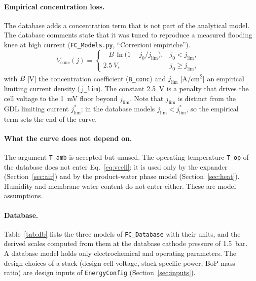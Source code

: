 \documentclass[a4paper,11pt]{article}
\newcommand{\code}[1]{\nolinkurl{#1}}
\newcommand{\fn}[1]{\nolinkurl{#1}}
\begin{document}
\paragraph{Empirical concentration loss.} The database adds a concentration term that is not
part of the analytical model. The database comments state that it was tuned to reproduce a
measured flooding knee at high current (\fn{FC_Models.py}, ``Correzioni empiriche'').
\begin{equation}
  V_\mathrm{conc}(j) = \begin{cases}
  -B\,\ln\!\big(1 - j_0/j_\mathrm{lim}\big), & j_0 < j_\mathrm{lim},\\
  \SI{2.5}{V}, & j_0 \ge j_\mathrm{lim},
  \end{cases}
\end{equation}
with $B$ [V] the concentration coefficient (\code{B_conc}) and $j_\mathrm{lim}$
[\si{A/cm^2}] an empirical limiting current density (\code{j_lim}). The constant
\SI{2.5}{V} is a penalty that drives the cell voltage to the \SI{1}{mV} floor beyond
$j_\mathrm{lim}$. Note that $j_\mathrm{lim}$ is distinct from the GDL limiting current
$j^*_\mathrm{lim}$; in the database models $j_\mathrm{lim} < j^*_\mathrm{lim}$, so the
empirical term sets the end of the curve.

\paragraph{What the curve does not depend on.} The argument \code{T_amb} is accepted but
unused. The operating temperature \code{T_op} of the database does not enter
Eq.~\eqref{eq:vcell}: it is used only by the expander (Section~\ref{sec:air}) and by the
product-water phase model (Section~\ref{sec:heat}). Humidity and membrane water content do
not enter either. These are model assumptions.

\paragraph{Database.} Table~\ref{tab:db} lists the three models of \fn{FC_Database} with
their units, and the derived scales computed from them at the database cathode pressure of
\SI{1.5}{bar}. A database model holds only electrochemical and operating parameters. The
design choices of a stack (design cell voltage, stack specific power, BoP mass ratio) are
design inputs of \code{EnergyConfig} (Section~\ref{sec:inputs}).
\end{document}
